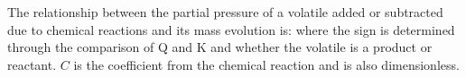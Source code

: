 The relationship between the partial pressure of a volatile added or subtracted due to chemical reactions and its mass evolution is: 
where the sign is determined through the comparison of Q and K and whether the volatile is a product or reactant. $C$ is the coefficient from the chemical reaction and is also dimensionless.  
